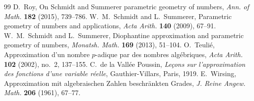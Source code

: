 \documentclass[10pt,a4paper]{amsart}
\begin{document}
\begin{thebibliography}{99}
 D.~Roy, On Schmidt and Summerer parametric geometry of numbers, \emph{Ann. of Math.} \textbf{182} (2015), 739--786.
 W.~M.~Schmidt and L.~Summerer, Parametric geometry of numbers and applications, \emph{Acta Arith.} \textbf{140} (2009), 67--91.
 W.~M.~Schmidt and L.~Summerer, Diophantine approximation and parametric geometry of numbers, \emph{Monatsh. Math.} \textbf{169} (2013), 51--104.
 O.~Teuli\'e, Approximation d'un nombre $p$-adique par des nombres alg\'ebriques, \emph{Acta Arith.} \textbf{102} (2002), no.~2, 137--155.
 C.~de la Vall\'ee Poussin, \emph{Le\c{c}ons sur l'approximation des fonctions d'une variable r\'eelle}, Gauthier-Villars, Paris, 1919.
 E.~Wirsing, Approximation mit algebraischen Zahlen beschr\"ankten Grades, \emph{J. Reine Angew. Math.} \textbf{206} (1961), 67--77.
\end{thebibliography}
\end{document}
